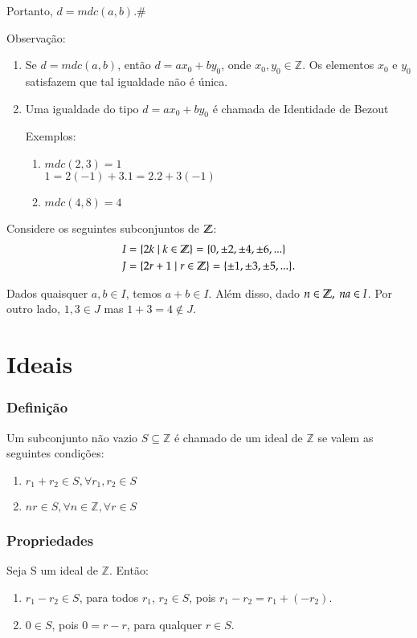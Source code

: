 Portanto, $d=mdc(a,b)$.\#

Observa{\c c}{\~a}o:
\begin{enumerate}
\item Se $d=mdc(a,b)$, ent{\~a}o $d=ax_{0}+by_{0}$, onde $x_{0},y_{0}\in\mathbb{Z}$. Os elementos $x_{0}$ e $y_{0}$ satisfazem que tal igualdade n{\~a}o {\'e} {\'u}nica.
\item Uma igualdade do tipo $d=ax_{0}+by_{0}$ {\'e} chamada de Identidade de Bezout

Exemplos:
\begin{enumerate}
\item $mdc(2,3)=1$\\
$1=2(-1)+3.1=2.2+3(-1)$
\item $mdc(4,8)=4$\\
\end{enumerate}
\end{enumerate}

Considere os seguintes subconjuntos de $\mathbb{Z}$:
\begin{align*}
	I &= \{2k \mid k\in\mathbb{Z}\} = \{0,\pm 2,\pm 4,\pm 6,...\}\\
	J &= \{2r+1\mid r\in\mathbb{Z}\} = \{\pm 1,\pm 3,\pm 5,...\}.
\end{align*}

Dados quaisquer $a,b\in I$, temos $a+b\in I$. Al{\'e}m disso, dado $n\in\mathbb{Z},\ na\in I$. Por outro lado, $1,3\in J$ mas $1+3=4\notin J$.

\section{Ideais}

\subsubsection{Defini{\c c}{\~a}o}
\begin{definicao}[Ideal] Um subconjunto n{\~a}o vazio $S\subseteq\mathbb{Z}$ {\'e} chamado de um ideal de $\mathbb{Z}$ se valem as seguintes condi{\c c}{\~o}es:
\begin{enumerate}
\item $r_{1}+r_{2}\in S,\forall r_{1},r_{2}\in S$
\item $nr\in S,\forall n\in\mathbb{Z},\forall r\in S$
\end{enumerate}
\end{definicao}

\subsubsection{Propriedades}
Seja S um ideal de $\mathbb{Z}$. Então:
\begin{enumerate}
\item $r_1 - r_2\in S$, para todos $r_1$, $r_2 \in S$, pois $r_1 - r_2 = r_1 + (-r_2)$.
\item $0 \in S$, pois $0 = r - r$, para qualquer $r\in S$.
\end{enumerate}

